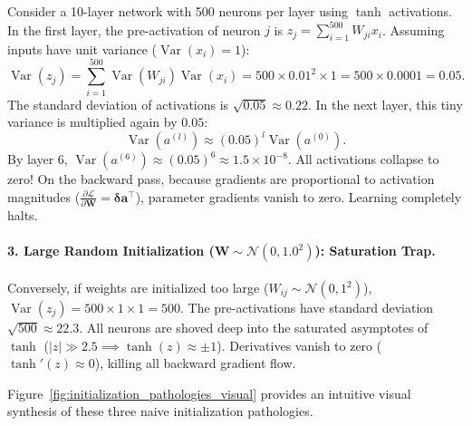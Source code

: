 Consider a 10-layer network with 500 neurons per layer using $\tanh$ activations. In the first layer, the pre-activation of neuron $j$ is $z_j = \sum_{i=1}^{500} W_{ji} x_i$. Assuming inputs have unit variance ($\operatorname{Var}(x_i) = 1$):
\begin{equation}
\operatorname{Var}(z_j) = \sum_{i=1}^{500} \operatorname{Var}(W_{ji}) \operatorname{Var}(x_i) = 500 \times 0.01^2 \times 1 = 500 \times 0.0001 = 0.05.
\end{equation}
The standard deviation of activations is $\sqrt{0.05} \approx 0.22$. In the next layer, this tiny variance is multiplied again by $0.05$:
\begin{equation}
\operatorname{Var}(a^{(l)}) \approx (0.05)^l \operatorname{Var}(a^{(0)}).
\end{equation}
By layer 6, $\operatorname{Var}(a^{(6)}) \approx (0.05)^6 \approx 1.5 \times 10^{-8}$. All activations collapse to zero! On the backward pass, because gradients are proportional to activation magnitudes ($\frac{\partial \mathcal{L}}{\partial \mathbf{W}} = \boldsymbol{\delta} \mathbf{a}^\top$), parameter gradients vanish to zero. Learning completely halts.

\paragraph{3. Large Random Initialization ($\mathbf{W} \sim \mathcal{N}(0, 1.0^2)$): Saturation Trap.}
Conversely, if weights are initialized too large ($W_{ij} \sim \mathcal{N}(0, 1^2)$), $\operatorname{Var}(z_j) = 500 \times 1 \times 1 = 500$. The pre-activations have standard deviation $\sqrt{500} \approx 22.3$. All neurons are shoved deep into the saturated asymptotes of $\tanh$ ($|z| \gg 2.5 \implies \tanh(z) \approx \pm 1$). Derivatives vanish to zero ($\tanh'(z) \approx 0$), killing all backward gradient flow.

Figure~\ref{fig:initialization_pathologies_visual} provides an intuitive visual synthesis of these three naive initialization pathologies.

